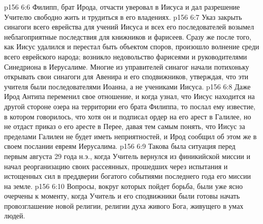 \vs p156 6:6 Филипп, брат Ирода, отчасти уверовал в Иисуса и дал разрешение Учителю свободно жить и трудиться в его владениях.
\vs p156 6:7 Указ закрыть синагоги всего еврейства для учений Иисуса и всех его последователей возымел неблагоприятные последствия для книжников и фарисеев. Сразу же после того, как Иисус удалился и перестал быть объектом споров, произошло волнение среди всего еврейского народа; возникло недовольство фарисеями и руководителями Синедриона в Иерусалиме. Многие из управителей синагог начали потихоньку открывать свои синагоги для Авенира и его сподвижников, утверждая, что эти учителя были последователями Иоанна, а не учениками Иисуса.
\vs p156 6:8 Даже Ирод Антипа переменил свое отношение, и когда узнал, что Иисус находится на другой стороне озера на территории его брата Филиппа, то послал ему известие, в котором говорилось, что хотя он и подписал ордер на его арест в Галилее, но не отдаст приказ о его аресте в Перее, давая тем самым понять, что Иисус за пределами Галилеи не будет иметь неприятностей, и Ирод сообщил об этом же в своем послании евреям Иерусалима.
\vs p156 6:9 Такова была ситуация перед первым августа 29 года н.э., когда Учитель вернулся из финикийской миссии и начал реорганизацию своих рассеянных, прошедших через испытания и истощенных сил в преддверии богатого событиями последнего года его миссии на земле.
\vs p156 6:10 Вопросы, вокруг которых пойдет борьба, были уже ясно очерчены к моменту, когда Учитель и его сподвижники были готовы начать провозглашение новой религии, религии духа живого Бога, живущего в умах людей.
